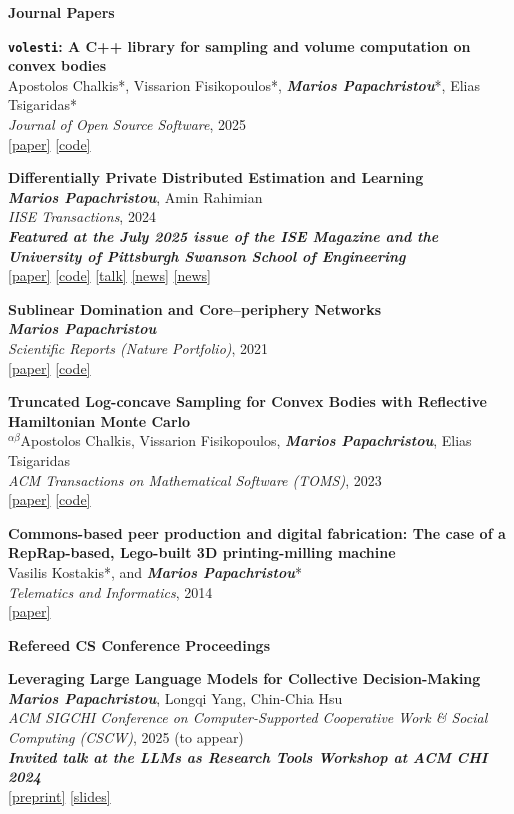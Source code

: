 \documentclass[margin]{res}
\newcommand{\field}[2]{\noindent \textbf{#1} \hfill #2 \\}
\newcommand{\alphabeticalorder}[0]{\ensuremath {^{\alpha \beta}}}
\newcommand{\specialurl}[2]{\href {#2} {{{[#1]}}}}
\newcommand{\preprint}[1]{\specialurl {preprint} {#1}}
\newcommand{\code}[1]{\specialurl {code} {#1}}
\newcommand{\talk}[1]{\specialurl {talk} {#1}}
\newcommand{\slides}[1]{\specialurl {slides} {#1}}
\newcommand{\paper}[1]{\specialurl {paper} {#1}}
\newcommand{\authorref}[1]{{\textit{\textbf{#1}}}}
\newcommand{\news}[1]{\specialurl {news} {#1}}
\newcommand{\authorme}{\authorref{Marios Papachristou}}
\newcommand{\bemph}[1]{\textbf{\emph{#1}}}
\newcommand{\publication}[5]{\textbf{#1}\\{#2}\\\emph{#3}, {#4}\\{#5}\smallskip}
\begin{document}
\begin{resume}
\field{Journal Papers}{}{
\begin{enumerate}[nosep, label={[J\arabic*]}]
	\item \publication{\texttt{volesti}: A C++ library for sampling and volume computation on convex bodies}{Apostolos Chalkis*, Vissarion Fisikopoulos*, \authorme*, Elias Tsigaridas*}{Journal of Open Source Software}{2025}{\paper{https://joss.theoj.org/papers/10.21105/joss.07886} \code{https://github.com/GeomScale/volesti}}
   \item \publication{Differentially Private Distributed Estimation and Learning}{\authorme, Amin Rahimian}{IISE Transactions}{2024}{\bemph{Featured at the July 2025 issue of the ISE Magazine and the University of Pittsburgh Swanson School of Engineering} \\
   	   	\paper{https://doi.org/10.1080/24725854.2024.2337068} \code{https://github.com/papachristoumarios/dp-distributed-estimation} \talk{https://www.youtube.com/watch?v=Kmm5HEMuS4w} \news{https://news.engineering.pitt.edu/who-sees-who/} \news{https://content.presspage.com/uploads/2602/19858d8c-d2d3-497e-9dcc-3f6eff36c157/ise-junefeature.pdf?10000}}
   \item \publication{Sublinear Domination and Core--periphery Networks}{\authorme}{Scientific Reports (Nature Portfolio)}{2021}{\paper{http://www.nature.com/articles/s41598-021-94105-8} \code{https://bit.ly/3wKNGI0}}
    \item \publication{Truncated Log-concave Sampling for Convex Bodies with Reflective Hamiltonian Monte Carlo}{\alphabeticalorder Apostolos Chalkis, Vissarion Fisikopoulos, \authorme, Elias Tsigaridas}{ACM Transactions on Mathematical Software (TOMS)}{2023}{\paper{https://doi.org/10.1145/3589505} \code{https://github.com/GeomScale/volume_approximation}}
    \item \publication{Commons-based peer production and digital fabrication: The case of a RepRap-based, Lego-built 3D printing-milling machine}{Vasilis Kostakis*, and \authorme*}{Telematics and Informatics}{2014}{\paper{https://bit.ly/2JRoisV}} 
    
\end{enumerate}}

\field{Refereed CS Conference Proceedings}{}{
\begin{enumerate}[nosep, label={[C\arabic*]}]


   \item \publication{Leveraging Large Language Models for Collective Decision-Making}{\authorme, Longqi Yang, Chin-Chia Hsu}{ACM SIGCHI Conference on Computer-Supported Cooperative Work \& Social Computing (CSCW)}{2025 (to appear)}{\textbf{\emph{Invited talk at the LLMs as Research Tools Workshop at ACM CHI 2024}} \\ \preprint{https://arxiv.org/abs/2311.04928} \slides{https://docs.google.com/presentation/d/13IsUt68rFoKdtq8wquL9fxVFHwH0hgvN/edit?usp=drive_link&ouid=109899272296285628946&rtpof=true&sd=true}}
 

\end{enumerate}}
\end{resume}
\end{document}
